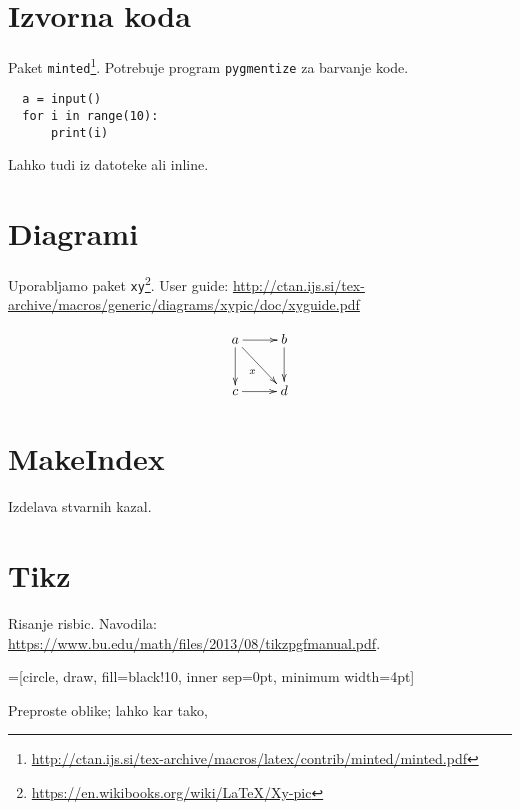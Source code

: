 \documentclass[a4paper,oneside,12pt]{article}
\begin{document}
\section{Izvorna koda}
Paket \verb|minted|\footnote{\url{http://ctan.ijs.si/tex-archive/macros/latex/contrib/minted/minted.pdf}}. Potrebuje program \verb|pygmentize| za barvanje kode.

\begin{verbatim}
  a = input()
  for i in range(10):
      print(i)
\end{verbatim}

Lahko tudi iz datoteke ali inline.

\section{Diagrami}

Uporabljamo paket \verb|xy|\footnote{\url{https://en.wikibooks.org/wiki/LaTeX/Xy-pic}}.
User guide: {\small \url{http://ctan.ijs.si/tex-archive/macros/generic/diagrams/xypic/doc/xyguide.pdf}}

\[
\xymatrix{
 a \ar[r] \ar[d] \ar[dr]_{x}& b \ar[d] \\ c \ar[r] & d
}
\]

\section{MakeIndex}
Izdelava stvarnih kazal.

\section{Tikz}
Risanje risbic. Navodila: \url{https://www.bu.edu/math/files/2013/08/tikzpgfmanual.pdf}.



=[circle, draw, fill=black!10,
inner sep=0pt, minimum width=4pt]

Preproste oblike; lahko kar tako, 
\end{document}
